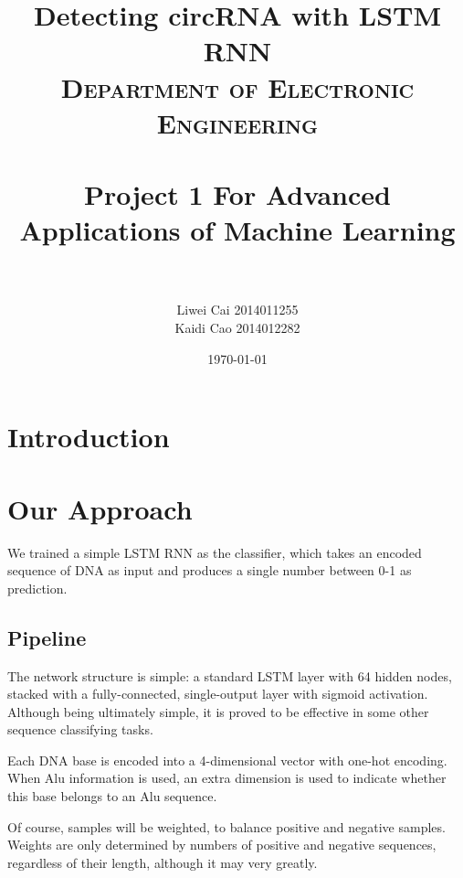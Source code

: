 \documentclass[10pt,a4paper]{article}
\title{Detecting circRNA with LSTM RNN \\
\normalfont \normalsize
\textsc{Department of Electronic Engineering} \\ [25pt]
\horrule{0.5pt} \\[0.4cm] %
\huge Project 1 For Advanced Applications of Machine Learning\\ %
\horrule{2pt} \\[0.5cm] %
}
\author{ Liwei Cai 2014011255\\
	Kaidi Cao 2014012282 } %
\date{\normalsize\today} %
\begin{document}
	
\begin{spacing}{1.5}
\begin{titlepage}
\maketitle %
\end{titlepage}

\newpage

\section{Introduction}

\section{Our Approach}
We trained a simple LSTM RNN as the classifier, which takes an encoded sequence of DNA as input and produces a single number between 0-1 as prediction.
\subsection{Pipeline}
\par The network structure is simple: a standard LSTM layer with 64 hidden nodes, stacked with a fully-connected, single-output layer with sigmoid activation. Although being ultimately simple, it is proved to be effective in some other sequence classifying tasks. 
\par Each DNA base is encoded into a 4-dimensional vector with one-hot encoding. When Alu information is used, an extra dimension is used to indicate whether this base belongs to an Alu sequence.
\par Of course, samples will be weighted, to balance positive and negative samples. Weights are only determined by numbers of positive and negative sequences, regardless of their length, although it may very greatly.

\end{spacing}
\end{document}
